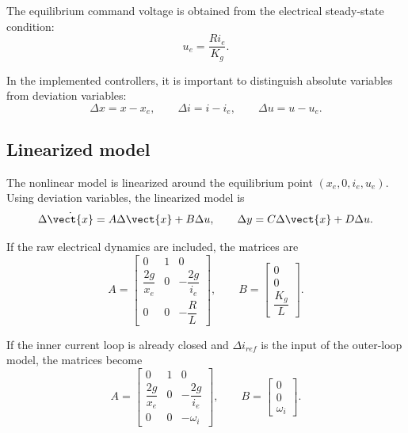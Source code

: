The equilibrium command voltage is obtained from the electrical steady-state condition:
\begin{equation}
    u_e = \frac{R i_e}{K_g}.
    \label{eq:equilibrium_voltage}
\end{equation}

In the implemented controllers, it is important to distinguish absolute variables from deviation variables:
\begin{equation}
    \Delta x = x - x_e, \qquad \Delta i = i - i_e, \qquad \Delta u = u - u_e.
\end{equation}

\subsection{Linearized model}

The nonlinear model is linearized around the equilibrium point $\left(x_e,0,i_e,u_e\right)$. Using deviation variables, the linearized model is
\begin{equation}
    \Delta\dot{\vect{x}} = A\Delta\vect{x} + B\Delta u,
    \qquad
    \Delta y = C\Delta\vect{x} + D\Delta u.
    \label{eq:linear_ss_general}
\end{equation}

If the raw electrical dynamics are included, the matrices are
\begin{equation}
A =
\begin{bmatrix}
0 & 1 & 0 \\
\dfrac{2g}{x_e} & 0 & -\dfrac{2g}{i_e} \\
0 & 0 & -\dfrac{R}{L}
\end{bmatrix},
\qquad
B =
\begin{bmatrix}
0 \\
0 \\
\dfrac{K_g}{L}
\end{bmatrix}.
\label{eq:linear_matrices_voltage}
\end{equation}

If the inner current loop is already closed and $\Delta i_{ref}$ is the input of the outer-loop model, the matrices become
\begin{equation}
A =
\begin{bmatrix}
0 & 1 & 0 \\
\dfrac{2g}{x_e} & 0 & -\dfrac{2g}{i_e} \\
0 & 0 & -\omega_i
\end{bmatrix},
\qquad
B =
\begin{bmatrix}
0 \\
0 \\
\omega_i
\end{bmatrix}.
\label{eq:linear_matrices_current_loop}
\end{equation}

